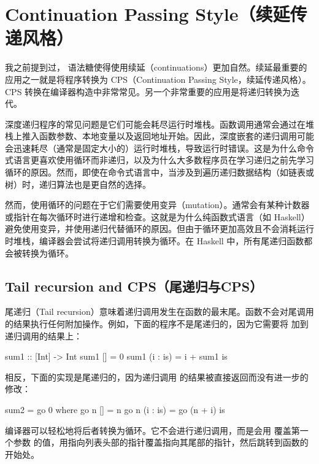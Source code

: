 \documentclass[DaoFP]{subfiles}
\begin{document}
    \section{Continuation Passing Style（续延传递风格）}

    我之前提到过， 语法糖使得使用续延（continuations）更加自然。续延最重要的应用之一就是将程序转换为 CPS（Continuation Passing Style，续延传递风格）。CPS 转换在编译器构造中非常常见。另一个非常重要的应用是将递归转换为迭代。

    深度递归程序的常见问题是它们可能会耗尽运行时堆栈。函数调用通常会通过在堆栈上推入函数参数、本地变量以及返回地址开始。因此，深度嵌套的递归调用可能会迅速耗尽（通常是固定大小的）运行时堆栈，导致运行时错误。这是为什么命令式语言更喜欢使用循环而非递归，以及为什么大多数程序员在学习递归之前先学习循环的原因。然而，即使在命令式语言中，当涉及到遍历递归数据结构（如链表或树）时，递归算法也是更自然的选择。

    然而，使用循环的问题在于它们需要使用变异（mutation）。通常会有某种计数器或指针在每次循环时进行递增和检查。这就是为什么纯函数式语言（如 Haskell）避免使用变异，并使用递归代替循环的原因。但由于循环更加高效且不会消耗运行时堆栈，编译器会尝试将递归调用转换为循环。在 Haskell 中，所有尾递归函数都会被转换为循环。

    \subsection{Tail recursion and CPS（尾递归与CPS）}

    尾递归（Tail recursion）意味着递归调用发生在函数的最末尾。函数不会对尾调用的结果执行任何附加操作。例如，下面的程序不是尾递归的，因为它需要将  加到递归调用的结果上：

    \begin{haskell}
        sum1 :: [Int] -> Int
        sum1 [] = 0
        sum1 (i : is) = i + sum1 is
    \end{haskell}

    相反，下面的实现是尾递归的，因为递归调用  的结果被直接返回而没有进一步的修改：

    \begin{haskell}
        sum2 = go 0
        where go n [] = n
        go n (i : is) = go (n + i) is
    \end{haskell}

    编译器可以轻松地将后者转换为循环。它不会进行递归调用，而是会用  覆盖第一个参数  的值，用指向列表头部的指针覆盖指向其尾部的指针，然后跳转到函数的开始处。
\end{document}

